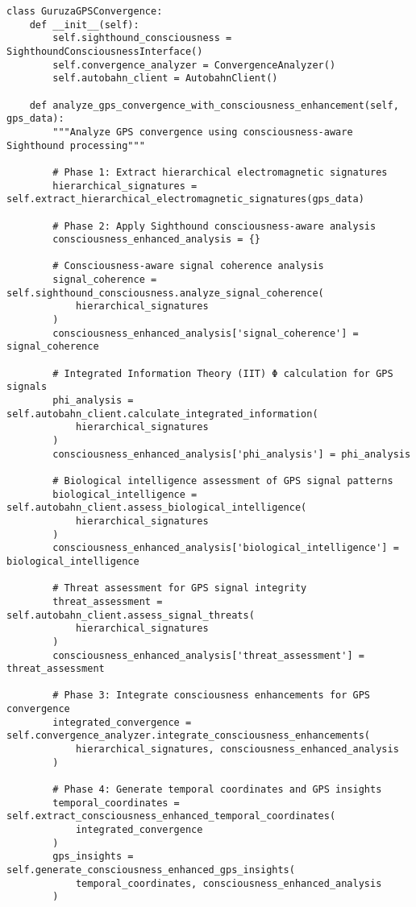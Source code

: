 \documentclass[12pt,a4paper]{article}
\begin{document}
\begin{lstlisting}[style=pythonstyle, caption=Guruza Convergence with Sighthound Consciousness Integration]
class GuruzaGPSConvergence:
    def __init__(self):
        self.sighthound_consciousness = SighthoundConsciousnessInterface()
        self.convergence_analyzer = ConvergenceAnalyzer()
        self.autobahn_client = AutobahnClient()
    
    def analyze_gps_convergence_with_consciousness_enhancement(self, gps_data):
        """Analyze GPS convergence using consciousness-aware Sighthound processing"""
        
        # Phase 1: Extract hierarchical electromagnetic signatures
        hierarchical_signatures = self.extract_hierarchical_electromagnetic_signatures(gps_data)
        
        # Phase 2: Apply Sighthound consciousness-aware analysis
        consciousness_enhanced_analysis = {}
        
        # Consciousness-aware signal coherence analysis
        signal_coherence = self.sighthound_consciousness.analyze_signal_coherence(
            hierarchical_signatures
        )
        consciousness_enhanced_analysis['signal_coherence'] = signal_coherence
        
        # Integrated Information Theory (IIT) Φ calculation for GPS signals
        phi_analysis = self.autobahn_client.calculate_integrated_information(
            hierarchical_signatures
        )
        consciousness_enhanced_analysis['phi_analysis'] = phi_analysis
        
        # Biological intelligence assessment of GPS signal patterns
        biological_intelligence = self.autobahn_client.assess_biological_intelligence(
            hierarchical_signatures
        )
        consciousness_enhanced_analysis['biological_intelligence'] = biological_intelligence
        
        # Threat assessment for GPS signal integrity
        threat_assessment = self.autobahn_client.assess_signal_threats(
            hierarchical_signatures
        )
        consciousness_enhanced_analysis['threat_assessment'] = threat_assessment
        
        # Phase 3: Integrate consciousness enhancements for GPS convergence
        integrated_convergence = self.convergence_analyzer.integrate_consciousness_enhancements(
            hierarchical_signatures, consciousness_enhanced_analysis
        )
        
        # Phase 4: Generate temporal coordinates and GPS insights
        temporal_coordinates = self.extract_consciousness_enhanced_temporal_coordinates(
            integrated_convergence
        )
        gps_insights = self.generate_consciousness_enhanced_gps_insights(
            temporal_coordinates, consciousness_enhanced_analysis
        )
        

\end{lstlisting}
\end{document}
